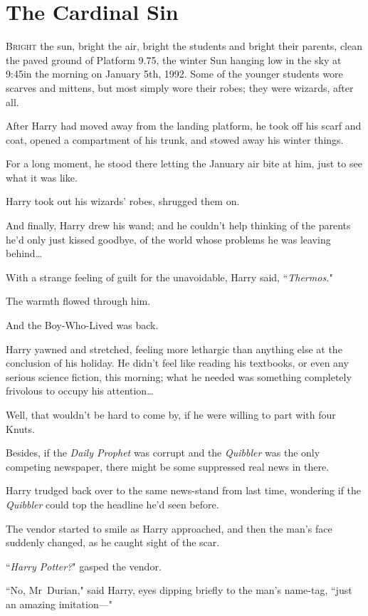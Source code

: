 \chapter{The Cardinal Sin}

\lettrine{B}{right} the sun, bright the air, bright the students and bright their parents, clean the paved ground of Platform 9.75, the winter Sun hanging low in the sky at 9:45\am in the morning on January 5th, 1992. Some of the younger students wore scarves and mittens, but most simply wore their robes; they were wizards, after all.

After Harry had moved away from the landing platform, he took off his scarf and coat, opened a compartment of his trunk, and stowed away his winter things.

For a long moment, he stood there letting the January air bite at him, just to see what it was like.

Harry took out his wizards' robes, shrugged them on.

And finally, Harry drew his wand; and he couldn't help thinking of the parents he'd only just kissed goodbye, of the world whose problems he was leaving behind{\ldots}

With a strange feeling of guilt for the unavoidable, Harry said, ``\emph{Thermos.}"

The warmth flowed through him.

And the Boy-Who-Lived was back.

Harry yawned and stretched, feeling more lethargic than anything else at the conclusion of his holiday. He didn't feel like reading his textbooks, or even any serious science fiction, this morning; what he needed was something completely frivolous to occupy his attention{\ldots}

Well, that wouldn't be hard to come by, if he were willing to part with four Knuts.

Besides, if the \emph{Daily Prophet} was corrupt and the \emph{Quibbler} was the only competing newspaper, there might be some suppressed real news in there.

Harry trudged back over to the same news-stand from last time, wondering if the \emph{Quibbler} could top the headline he'd seen before.

The vendor started to smile as Harry approached, and then the man's face suddenly changed, as he caught sight of the scar.

``\emph{Harry Potter?}" gasped the vendor.

``No, Mr~Durian," said Harry, eyes dipping briefly to the man's name-tag, ``just an amazing imitation—"

